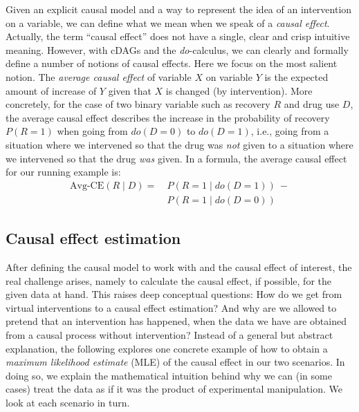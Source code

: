 \documentclass[nobib]{tufte-handout}
\newcommand{\docalc}{\emph{do}-calculus\xspace}
\newcommand{\mathdo}{\mathit{do}}
\begin{document}
Given an explicit causal model and a way to represent the idea of an intervention on a variable, we can define what we mean when we speak of a \textit{causal effect}.
Actually, the term ``causal effect'' does not have a single, clear and crisp intuitive meaning.
However, with cDAGs and the \docalc, we can clearly and formally define a number of notions of causal effects.
Here we focus on the most salient notion.
The \textit{average causal effect} of variable $X$ on variable $Y$ is the expected amount of increase of $Y$ given that $X$ is changed (by intervention).
More concretely, for the case of two binary variable such as recovery $R$ and drug use $D$, the average causal effect describes the increase in the probability of recovery $P(R = 1)$ when going from $\mathdo(D=0)$ to $\mathdo(D=1)$, i.e., going from a situation where we intervened so that the drug was \textit{not} given to a situation where we intervened so that the drug \textit{was} given.
In a formula, the average causal effect for our running example is:
\begin{align*}
  \text{Avg-CE}(R \mid D) = & \ P(R=1 \mid \mathdo(D=1)) \  -
                        \\ & \ P(R=1 \mid \mathdo(D=0))
\end{align*}


\subsection{Causal effect estimation} \label{sec:causal-effect}

After defining the causal model to work with and the causal effect of interest, the real challenge arises, namely to calculate the causal effect, if possible, for the given data at hand.
This raises deep conceptual questions:
How do we get from virtual interventions to a causal effect estimation?
And why are we allowed to pretend that an intervention has happened, when the data we have are obtained from a causal process without intervention?
Instead of a general but abstract explanation, the following explores one concrete example of how to obtain a \textit{maximum likelihood estimate} (MLE) of the causal effect in our two scenarios.
In doing so, we explain the mathematical intuition behind why we can (in some cases) treat the data as if it was the product of experimental manipulation.
We look at each scenario in turn.
\end{document}
